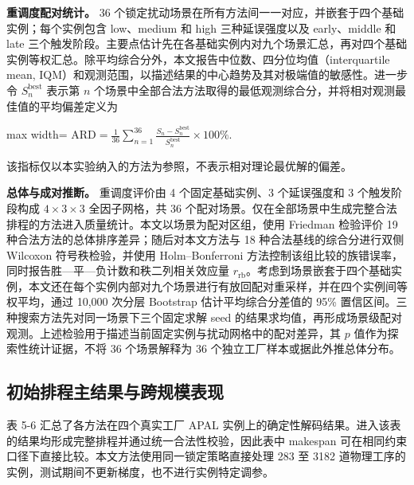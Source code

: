 \documentclass[journal,10pt]{IEEEtran}
\begin{document}
\textbf{重调度配对统计。} 36 个锁定扰动场景在所有方法间一一对应，并嵌套于四个基础实例；每个实例包含 low、medium 和 high 三种延误强度以及 early、middle 和 late 三个触发阶段。主要点估计先在各基础实例内对九个场景汇总，再对四个基础实例等权汇总。除平均综合分外，本文报告中位数、四分位均值（interquartile mean, IQM）和观测范围，以描述结果的中心趋势及其对极端值的敏感性。进一步令 \(S_n^{\mathrm{best}}\) 表示第 \(n\) 个场景中全部合法方法取得的最低观测综合分，并将相对观测最佳值的平均偏差定义为

\begin{center}
\begin{adjustbox}{max width=\columnwidth}
$\displaystyle
\mathrm{ARD}=\frac{1}{36}\sum_{n=1}^{36}
\frac{S_n-S_n^{\mathrm{best}}}{S_n^{\mathrm{best}}}\times100\%.
$
\end{adjustbox}
\end{center}

该指标仅以本实验纳入的方法为参照，不表示相对理论最优解的偏差。

\textbf{总体与成对推断。} 重调度评价由 4 个固定基础实例、3 个延误强度和 3 个触发阶段构成 \(4\times3\times3\) 全因子网格，共 36 个配对场景。仅在全部场景中生成完整合法排程的方法进入质量统计。本文以场景为配对区组，使用 Friedman 检验评价 19 种合法方法的总体排序差异；随后对本文方法与 18 种合法基线的综合分进行双侧 Wilcoxon 符号秩检验，并使用 Holm--Bonferroni 方法控制该组比较的族错误率，同时报告胜---平---负计数和秩二列相关效应量 \(r_{\mathrm{rb}}\)。考虑到场景嵌套于四个基础实例，本文还在每个实例内部对九个场景进行有放回配对重采样，并在四个实例间等权平均，通过 10,000 次分层 Bootstrap 估计平均综合分差值的 95\% 置信区间。三种搜索方法先对同一场景下三个固定求解 seed 的结果求均值，再形成场景级配对观测。上述检验用于描述当前固定实例与扰动网格中的配对差异，其 \(p\) 值作为探索性统计证据，不将 36 个场景解释为 36 个独立工厂样本或据此外推总体分布。

\subsection{初始排程主结果与跨规模表现}\label{ux521dux59cbux6392ux7a0bux4e3bux7ed3ux679cux4e0eux8de8ux89c4ux6a21ux8868ux73b0}

表 5-6 汇总了各方法在四个真实工厂 APAL 实例上的确定性解码结果。进入该表的结果均形成完整排程并通过统一合法性校验，因此表中 makespan 可在相同约束口径下直接比较。本文方法使用同一锁定策略直接处理 283 至 3182 道物理工序的实例，测试期间不更新梯度，也不进行实例特定调参。
\end{document}
